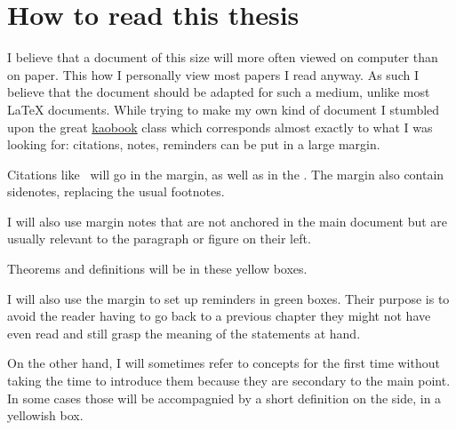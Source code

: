 \chapter*{How to read this thesis}

I believe that a document of this size will more often viewed on computer than
on paper. This how I personally view most papers I read anyway.
As such I believe that the document should be adapted for such a medium, unlike
most \LaTeX{} documents.
While trying to make my own kind of document I stumbled upon the great
\href{https://github.com/fmarotta/kaobook/}{kaobook} class which corresponds
almost exactly to what I was looking for: citations, notes, reminders can be put
in a large margin.

Citations like~ will go in the
margin, as well as in the .
The margin also contain sidenotes, replacing the usual footnotes.

I will also use margin notes that are not anchored in the main document but are
usually relevant to the paragraph or figure on their left.

\begin{theorem}
  Theorems and definitions will be in these yellow boxes.
\end{theorem}

I will also use the margin to set up reminders in green boxes. Their purpose
is to avoid the reader having to go back to a previous chapter they might not
have even read and still grasp the meaning of the statements at hand.

On the other hand, I will sometimes refer to concepts for the first time without
taking the time to introduce them because they are secondary to the main point.
In some cases those will be accompagnied by a short definition on the side, in
a yellowish box.